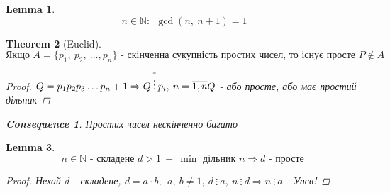 \documentclass[a4paper,12pt, centered]{bookest}
\newtheorem{theorem}{Theorem}[section]
\newtheorem{lemma}[theorem]{Lemma}
\newtheorem*{cons*}{Consequence}
\begin{document}
\begin{lemma}
	$$n\in\mathbb{N}:\>\>\gcd(n,\>n+1)=1$$
\end{lemma}
\begin{theorem}[Euclid]
	$$\textrm{Якщо }A=\{p_1,\>p_2,\>\dots,p_n\}\textrm{ - скінченна сукупність простих чисел, то існує просте } \underline{P}\notin A$$
	\begin{proof}
		$\\Q=p_1p_2p_3\dots p_n+1\Rightarrow Q\>\overline{\vdots }\>p_i,\>n=\overline{1,n}\\ Q$ - або просте, або має простий дільник
	\end{proof}
	\begin{cons*}
		$ $Простих чисел нескінченно багато
	\end{cons*}
\end{theorem}
\begin{lemma}
	$$n\in\mathbb{N} \textrm{ - складене } d>1\> -\>\min\textrm{ дільник } n\Rightarrow d\textrm{ - просте	}$$
	\begin{proof}
		$ $Нехай $d$ - складене, $d=a\cdot b,\>\>a,\>b\neq 1,\>d\>\vdots\>a,\>n\>\vdots\>d\Rightarrow n\>\vdots\>a$ - Упсв! 
	\end{proof}
\end{lemma}
\end{document}
